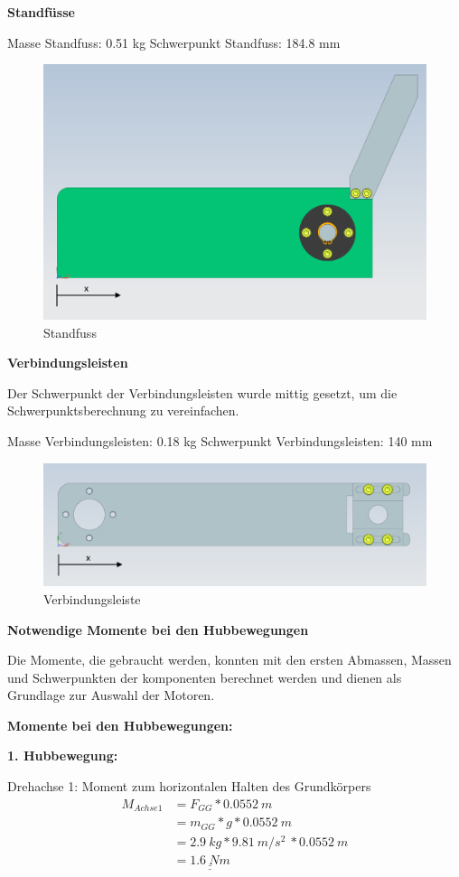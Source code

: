 \textbf{Standfüsse}

Masse Standfuss: 0.51 kg
Schwerpunkt Standfuss: 184.8 mm

\begin{figure}[H]
  \includegraphics[width=0.8
  \textwidth]{img/Treppensteigen/SP Standfuss final.png}
  \centering
  \caption{Standfuss}
\end{figure}

\textbf{Verbindungsleisten}

Der Schwerpunkt der Verbindungsleisten wurde mittig gesetzt, um die Schwerpunktsberechnung zu vereinfachen.

Masse Verbindungsleisten: 0.18 kg
Schwerpunkt Verbindungsleisten: 140 mm

\begin{figure}[H]
  \includegraphics[width=0.8
  \textwidth]{img/Treppensteigen/SP Verbindungsleiste final.png}
  \centering
  \caption{Verbindungsleiste}
\end{figure}

\textbf{Notwendige Momente bei den Hubbewegungen}

Die Momente, die gebraucht werden, konnten mit den ersten Abmassen, Massen und Schwerpunkten der komponenten berechnet werden und dienen als Grundlage zur Auswahl der Motoren.

\textbf{Momente bei den Hubbewegungen:}

\textbf{1. Hubbewegung:}

Drehachse 1: Moment zum horizontalen Halten des Grundkörpers
\begin{align*}
    M_{Achse 1} &= F_{GG} * 0.0552\ m \\
    &= m_{GG} * g * 0.0552\ m \\
    &= 2.9\ kg * 9.81\ m/s^2\ * 0.0552\ m \\
    &= \underline{\underline{1.6\ Nm}}
\end{align*}

